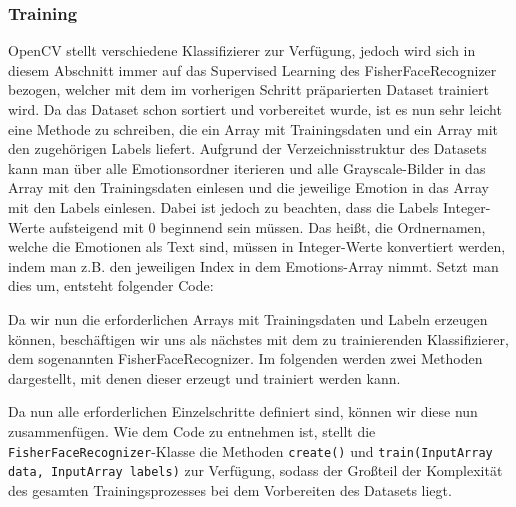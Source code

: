 \documentclass[12pt, a4paper]{scrbook}
\begin{document}
\subsubsection{Training}
OpenCV stellt verschiedene Klassifizierer zur Verfügung, jedoch wird sich in diesem Abschnitt immer auf das Supervised Learning des FisherFaceRecognizer bezogen, welcher mit dem im vorherigen Schritt präparierten Dataset trainiert wird. Da das Dataset schon sortiert und vorbereitet wurde, ist es nun sehr leicht eine Methode zu schreiben, die ein Array mit Trainingsdaten und ein Array mit den zugehörigen Labels liefert. Aufgrund der Verzeichnisstruktur des Datasets kann man über alle Emotionsordner iterieren und alle Grayscale-Bilder in das Array mit den Trainingsdaten einlesen und die jeweilige Emotion in das Array mit den Labels einlesen. Dabei ist jedoch zu beachten, dass die Labels Integer-Werte aufsteigend mit 0 beginnend sein müssen. Das heißt, die Ordnernamen, welche die Emotionen als Text sind, müssen in Integer-Werte konvertiert werden, indem man z.B. den jeweiligen Index in dem Emotions-Array  nimmt. Setzt man dies um, entsteht folgender Code:

Da wir nun die erforderlichen Arrays mit Trainingsdaten und Labeln erzeugen können, beschäftigen wir uns als nächstes mit dem zu trainierenden Klassifizierer, dem sogenannten FisherFaceRecognizer. Im folgenden werden zwei Methoden dargestellt, mit denen dieser erzeugt und trainiert werden kann.

Da nun alle erforderlichen Einzelschritte definiert sind, können wir diese nun zusammenfügen. 
Wie dem Code zu entnehmen ist, stellt die \texttt{FisherFaceRecognizer}-Klasse die Methoden \texttt{create()} und \texttt{train(InputArray data, InputArray labels)} zur Verfügung, sodass der Großteil der Komplexität des gesamten Trainingsprozesses bei dem Vorbereiten des Datasets liegt.
\end{document}
